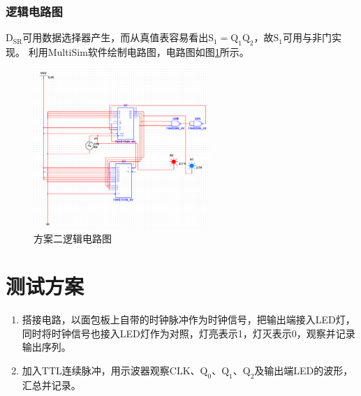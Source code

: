 \documentclass[zihao=-4]{ctexart} %
\begin{document}
  \subsubsection{逻辑电路图}
  $\mathrm{D_{SR}}$可用数据选择器产生，而从真值表容易看出$\mathrm{S_1=Q_1Q_2}$，故$\mathrm{S_1}$可用与非门实现。
  利用MultiSim软件绘制电路图，电路图如图\ref{fig:SR}所示。
\begin{figure}[htbp!]
    \centering
    \includegraphics[width=0.6\textwidth]{../img/Ex2_194.png} %
    \caption{方案二逻辑电路图}
    \label{fig:SR}
  \end{figure}
\section{测试方案}
\begin{enumerate}
\item 搭接电路，以面包板上自带的时钟脉冲作为时钟信号，把输出端接入LED灯，同时将时钟信号也接入LED灯作为对照，灯亮表示1，灯灭表示0，观察并记录输出序列。
\item 加入TTL连续脉冲，用示波器观察$\mathrm{CLK} $、$\mathrm{Q_0}$、$\mathrm{Q_1}$、$\mathrm{Q_2}$及输出端LED的波形，汇总并记录。
\end{enumerate}
\end{document}
